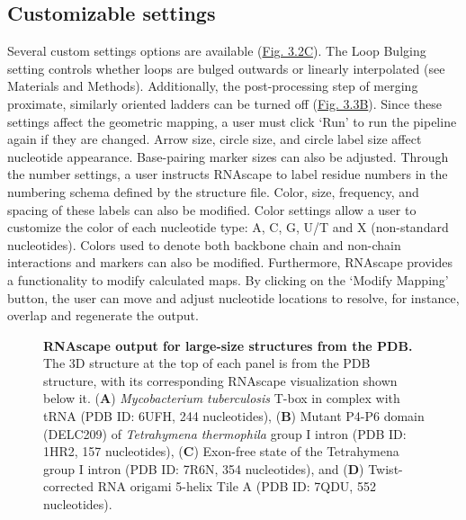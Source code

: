 \subsection{Customizable settings}

Several custom settings options are available (\hyperref[fig:rnascape2]{Fig. 3.2C}). The Loop Bulging setting controls whether loops are bulged outwards or linearly interpolated (see Materials and Methods). Additionally, the post-processing step of merging proximate, similarly oriented ladders can be turned off (\hyperref[fig:rnascape3]{Fig. 3.3B}). Since these settings affect the geometric mapping, a user must click ‘Run’ to run the pipeline again if they are changed. Arrow size, circle size, and circle label size affect nucleotide appearance. Base-pairing marker sizes can also be adjusted. Through the number settings, a user instructs RNAscape to label residue numbers in the numbering schema defined by the structure file. Color, size, frequency, and spacing of these labels can also be modified. Color settings allow a user to customize the color of each nucleotide type: A, C, G, U/T and X (non-standard nucleotides). Colors used to denote both backbone chain and non-chain interactions and markers can also be modified. Furthermore, RNAscape provides a functionality to modify calculated maps. By clicking on the ‘Modify Mapping’ button, the user can move and adjust nucleotide locations to resolve, for instance, overlap and regenerate the output.
\begin{center}
    \begin{figure}
        \caption[RNAscape output for large-size structures from the PDB.]{\textbf{RNAscape output for large-size structures from the PDB.} The 3D structure at the top of each panel is from the PDB structure, with its corresponding RNAscape visualization shown below it. ({\bf A}) \textit{Mycobacterium tuberculosis} T-box in complex with tRNA (PDB ID: 6UFH, 244 nucleotides), ({\bf B}) Mutant P4-P6 domain (DELC209) of \textit{Tetrahymena thermophila} group I intron (PDB ID: 1HR2, 157 nucleotides), ({\bf C}) Exon-free state of the Tetrahymena group I intron (PDB ID: 7R6N, 354 nucleotides), and ({\bf D}) Twist-corrected RNA origami 5-helix Tile A (PDB ID: 7QDU, 552 nucleotides).}
  \label{fig:rnascape4}
\end{figure}
\end{center}

